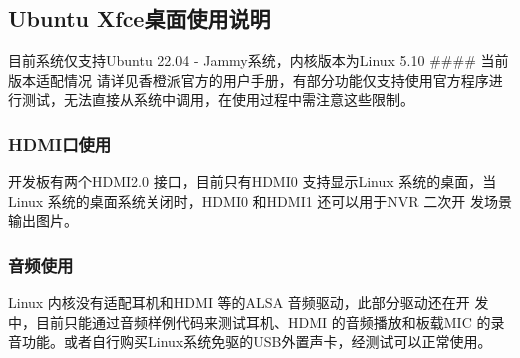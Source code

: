 \hypertarget{ubuntu-xfceux684cux9762ux4f7fux7528ux8bf4ux660e}{%
\subsection{Ubuntu
Xfce桌面使用说明}\label{ubuntu-xfceux684cux9762ux4f7fux7528ux8bf4ux660e}}

目前系统仅支持Ubuntu 22.04 - Jammy系统，内核版本为Linux 5.10 \#\#\#\#
当前版本适配情况
请详见香橙派官方的用户手册，有部分功能仅支持使用官方程序进行测试，无法直接从系统中调用，在使用过程中需注意这些限制。

\hypertarget{hdmiux53e3ux4f7fux7528}{%
\subsubsection{HDMI口使用}\label{hdmiux53e3ux4f7fux7528}}

开发板有两个HDMI2.0 接口，目前只有HDMI0 支持显示Linux
系统的桌面，当Linux 系统的桌面系统关闭时，HDMI0 和HDMI1 还可以用于NVR
二次开 发场景输出图片。

\hypertarget{ux97f3ux9891ux4f7fux7528}{%
\subsubsection{音频使用}\label{ux97f3ux9891ux4f7fux7528}}

Linux 内核没有适配耳机和HDMI 等的ALSA 音频驱动，此部分驱动还在开
发中，目前只能通过音频样例代码来测试耳机、HDMI 的音频播放和板载MIC
的录音功能。或者自行购买Linux系统免驱的USB外置声卡，经测试可以正常使用。

